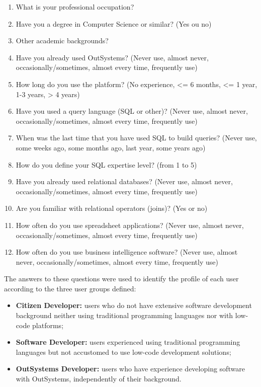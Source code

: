 \begin{enumerate}
    \item What is your professional occupation?
    \item Have you a degree in Computer Science or similar? (Yes ou no)
    \item Other academic backgrounds?
    \item Have you already used OutSystems? (Never use, almost never, occasionally/sometimes, almost every time, frequently use)
    \item How long do you use the platform? (No experience, <= 6 months, <= 1 year, 1-3 years, > 4 years)
    \item Have you used a query language (SQL or other)? (Never use, almost never, occasionally/sometimes, almost every time, frequently use)
    \item When was the last time that you have used SQL to build queries? (Never use, some weeks ago, some months ago, last year, some years ago)
    \item How do you define your SQL expertise level? (from 1 to 5)
    \item Have you already used relational databases? (Never use, almost never, occasionally/sometimes, almost every time, frequently use)
    \item Are you familiar with relational operators (joins)? (Yes or no)
    \item How often do you use spreadsheet applications? (Never use, almost never, occasionally/sometimes, almost every time, frequently use)
    \item How often do you use business intelligence software? (Never use, almost never, occasionally/sometimes, almost every time, frequently use)
\end{enumerate}

The answers to these questions were used to identify the profile of each user according to the three user groups defined:

\begin{itemize}
    \item \textbf{Citizen Developer: } users who do not have extensive software development background neither using traditional programming languages nor with low-code platforms;
    \item \textbf{Software Developer: } users experienced using traditional programming languages but not accustomed to use low-code development solutions;
    \item \textbf{OutSystems Developer: } users who have experience developing software with OutSystems, independently of their background.
\end{itemize}

